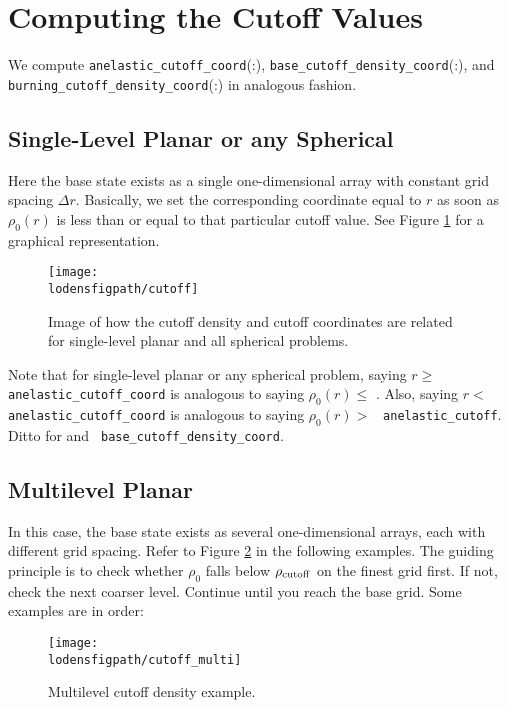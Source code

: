 \section{Computing the Cutoff Values}
We compute {\tt anelastic\_cutoff\_coord}(:), {\tt base\_cutoff\_density\_coord}(:), 
and {\tt burning\_cutoff\_density\_coord}(:) in analogous fashion.

\subsection{Single-Level Planar or any Spherical}
Here the base state exists as a single one-dimensional array with constant grid
spacing $\Delta r$.  Basically, we set the corresponding coordinate equal to $r$ as soon 
as $\rho_0(r)$ is less than  or equal to that particular cutoff value.
See Figure \ref{Fig:Cutoff} for a graphical representation.
\begin{figure}[hpb]
\centering
\texttt{[image: \\lodensfigpath/cutoff]}\hspace{0.2in}
\caption[Cutoff density and coordinates]{Image of how the cutoff density and cutoff coordinates
are related for single-level planar and all spherical problems.}
\label{Fig:Cutoff}
\end{figure}

Note that for single-level planar or any spherical problem, saying
$r\ge$ {\tt anelastic\_cutoff\_coord} is analogous to saying
$\rho_0(r)\le$ .  Also, saying $r<$ {\tt
anelastic\_cutoff\_coord} is analogous to saying $\rho_0(r)>$ {\tt
anelastic\_cutoff}.  Ditto for  and {\tt
base\_cutoff\_density\_coord}.

\subsection{Multilevel Planar}
In this case, the base state exists as several one-dimensional arrays, each with
different grid spacing.  Refer to Figure \ref{Fig:Cutoff_Multi} in the following examples.
The guiding principle is to check whether $\rho_0$ falls below $\rho_{\rm cutoff}$ on the finest
grid first.  If not, check the next coarser level.  Continue until you reach the base grid.
Some examples are in order:
\begin{figure}[hpb]
\centering
\texttt{[image: \\lodensfigpath/cutoff\_multi]}\hspace{0.2in}
\caption{Multilevel cutoff density example.}
\label{Fig:Cutoff_Multi}
\end{figure}

